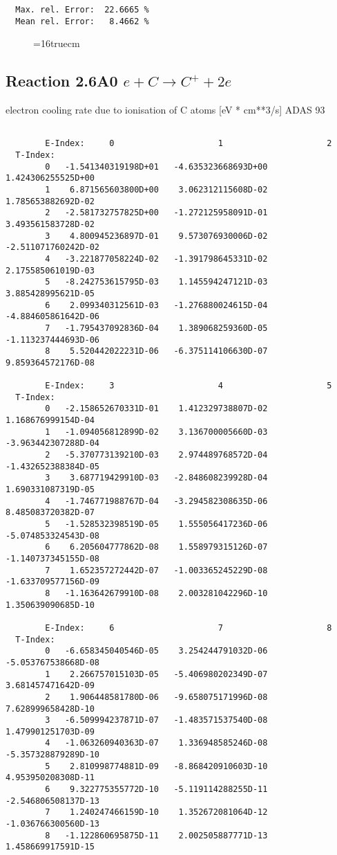 \documentclass[12pt]{article}
\begin{document}
\begin{small}
\begin{verbatim}
  Max. rel. Error:  22.6665 %
  Mean rel. Error:   8.4662 %
\end{verbatim}\end{small}
\begin{figure} \label{2.3.13aer}
\epsfxsize=16truecm
\end{figure}
\newpage

\subsection{
  Reaction 2.6A0  $e + C  \rightarrow C^+   + 2e $
}
electron cooling rate due to ionisation of C atoms [eV * cm**3/s]
ADAS 93

\begin{small}\begin{verbatim}

        E-Index:     0                     1                     2
  T-Index:
        0   -1.541340319198D+01   -4.635323668693D+00    1.424306255525D+00
        1    6.871565603800D+00    3.062312115608D-02    1.785653882692D-02
        2   -2.581732757825D+00   -1.272125958091D-01    3.493561583728D-02
        3    4.800945236897D-01    9.573076930006D-02   -2.511071760242D-02
        4   -3.221877058224D-02   -1.391798645331D-02    2.175585061019D-03
        5   -8.242753615795D-03    1.145594247121D-03    3.885428995621D-05
        6    2.099340312561D-03   -1.276880024615D-04   -4.884605861642D-06
        7   -1.795437092836D-04    1.389068259360D-05   -1.113237444693D-06
        8    5.520442022231D-06   -6.375114106630D-07    9.859364572176D-08

        E-Index:     3                     4                     5
  T-Index:
        0   -2.158652670331D-01    1.412329738807D-02    1.168676999154D-04
        1   -1.094056812899D-02    3.136700005660D-03   -3.963442307288D-04
        2   -5.370773139210D-03    2.974489768572D-04   -1.432652388384D-05
        3    3.687719429910D-03   -2.848608239928D-04    1.690331087319D-05
        4   -1.746771988767D-04   -3.294582308635D-06    8.485083720382D-07
        5   -1.528532398519D-05    1.555056417236D-06   -5.074853324543D-08
        6    6.205604777862D-08    1.558979315126D-07   -1.140737345155D-08
        7    1.652357272442D-07   -1.003365245229D-08   -1.633709577156D-09
        8   -1.163642679910D-08    2.003281042296D-10    1.350639090685D-10

        E-Index:     6                     7                     8
  T-Index:
        0   -6.658345040546D-05    3.254244791032D-06   -5.053767538668D-08
        1    2.266757015103D-05   -5.406980202349D-07    3.681457471642D-09
        2    1.906448581780D-06   -9.658075171996D-08    7.628999658428D-10
        3   -6.509994237871D-07   -1.483571537540D-08    1.479901251703D-09
        4   -1.063260940363D-07    1.336948585246D-08   -5.357328879289D-10
        5    2.810998774881D-09   -8.868420910603D-10    4.953950208308D-11
        6    9.322775355772D-10   -5.119114288255D-11   -2.546806508137D-13
        7    1.240247466159D-10    1.352672081064D-12   -1.036766300560D-13
        8   -1.122860695875D-11    2.002505887771D-13    1.458669917591D-15


\end{verbatim}
\end{small}
\end{document}
